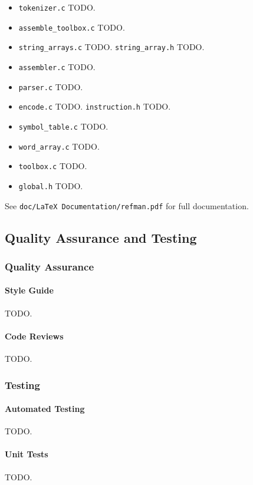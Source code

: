 \documentclass[10pt]{article}
\begin{document}
\begin{itemize}
\item \texttt{tokenizer.c} TODO.
\item \texttt{assemble\_toolbox.c} TODO.
\item \texttt{string\_arrays.c} TODO. \texttt{string\_array.h} TODO.
\item \texttt{assembler.c} TODO.
\item \texttt{parser.c} TODO.
\item \texttt{encode.c} TODO. \texttt{instruction.h} TODO.
\item \texttt{symbol\_table.c} TODO.
\item \texttt{word\_array.c} TODO.
\item \texttt{toolbox.c} TODO.
\item \texttt{global.h} TODO.
\end{itemize}

See \texttt{doc/LaTeX Documentation/refman.pdf} for full documentation.

\subsection{Quality Assurance and Testing}

\subsubsection{Quality Assurance}

\paragraph{Style Guide}
TODO.

\paragraph{Code Reviews}
TODO.

\subsubsection{Testing}

\paragraph{Automated Testing}
TODO.

\paragraph{Unit Tests}
TODO.
\end{document}
